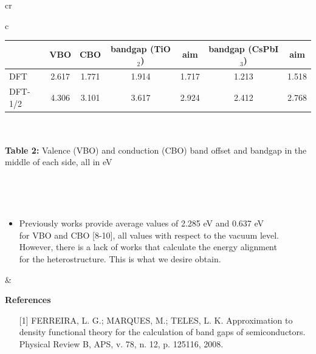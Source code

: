 \documentclass[a0,portrait]{a0poster}
\begin{document}
\begin{table}[hhh]
\begin{tabular}{cr}

\hspace{2cm}

\begin{tabular}{c}
\begin{tabular}{lcccccc}
\toprule 
 & VBO & CBO & bandgap (TiO$_2$) & aim & bandgap (CsPbI$_3$) & aim \\
\midrule 
DFT & 2.617 & 1.771 & 1.914 & 1.717 & 1.213 & 1.518 \\
DFT-1/2 & 4.306 & 3.101 & 3.617 & 2.924 & 2.412 & 2.768 \\
\bottomrule
\end{tabular}
\\
\vspace{0cm}
\\

\small{\textbf{Table 2:} Valence (VBO) and conduction (CBO) band offset and bandgap in the middle of each side, all in eV}

\\
\vspace{0.5cm}

\begin{minipage}{30cm}
\justify
\
\begin{itemize}
\item{\large Previously works provide average values of 2.285 eV and 0.637 eV \\[0.3cm] for VBO and CBO [8-10], all values with respect to the vacuum level.\\[0.3cm]However, there is a lack of works that calculate the energy alignment\\[0.3cm] for the heterostructure. This is what we desire obtain.}
\end{itemize}
\end{minipage}

\end{tabular}

&

\hspace{7cm}

\begin{minipage}{35cm}

\Large{\bf References}

\scriptsize{
\begin{itemize}[labelindent=1em]
\item[{[1]}]FERREIRA, L. G.; MARQUES, M.; TELES, L. K. Approximation to density functional theory for the calculation of band gaps of semiconductors. Physical Review B, APS, v. 78, n. 12, p. 125116, 2008.


\end{itemize}}
\end{minipage}
\end{tabular}
\end{table}
\end{document}
